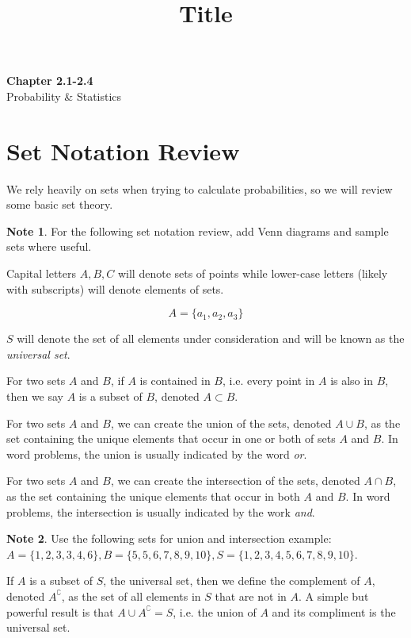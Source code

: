 \documentclass[11pt]{article}
\theoremstyle{definition}
\newtheorem{note}{Note}
\begin{document}
\title{Title}

\thispagestyle{empty}

\begin{center}
{\LARGE \bf Chapter 2.1-2.4}\\
{\large Probability \& Statistics}
\end{center}
\section{Set Notation Review}
We rely heavily on sets when trying to calculate probabilities, so we will review some basic set theory.

\begin{note}
	For the following set notation review, add Venn diagrams and sample sets where useful.
\end{note}

Capital letters $A, B, C$ will denote sets of points while lower-case letters (likely with subscripts) will denote elements of sets.

$$
A = \{a_1, a_2, a_3\}
$$

$S$ will denote the set of all elements under consideration and will be known as the \textit{universal set}.

For two sets $A$ and $B$, if $A$ is contained in $B$, i.e. every point in $A$ is also in $B$, then we say $A$ is a subset of $B$, denoted $A \subset B$.

For two sets $A$ and $B$, we can create the union of the sets, denoted $A \cup B$, as the set containing the unique elements that occur in one or both of sets $A$ and $B$. In word problems, the union is usually indicated by the word \textit{or}.

For two sets $A$ and $B$, we can create the intersection of the sets, denoted $A \cap B$, as the set containing the unique elements that occur in both $A$ and $B$. In word problems, the intersection is usually indicated by the work \textit{and}.

\begin{note}
	Use the following sets for union and intersection example: $A = \{1, 2, 3, 3, 4, 6\},  B = \{5, 5, 6, 7, 8, 9, 10\}, S = \{1, 2, 3, 4, 5, 6, 7, 8, 9, 10\}$.
\end{note}

If $A$ is a subset of $S$, the universal set, then we define the complement of $A$, denoted $A^\complement$, as the set of all elements in $S$ that are not in $A$. A simple but powerful result is that $A \cup A^\complement = S$, i.e. the union of $A$ and its compliment is the universal set.
\end{document}
